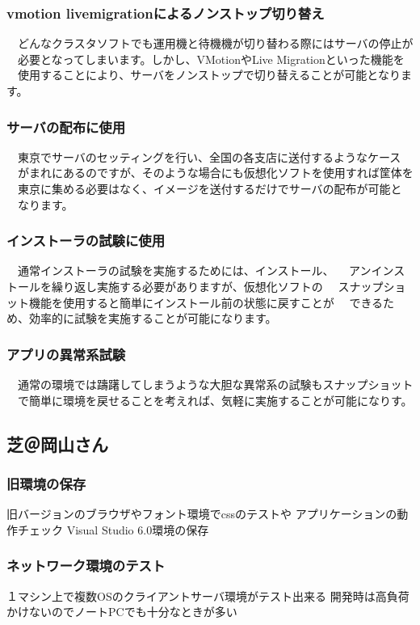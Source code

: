 \documentclass[mingoth,a4paper]{jsarticle}
\begin{document}
\subsubsection{vmotion livemigrationによるノンストップ切り替え}
　どんなクラスタソフトでも運用機と待機機が切り替わる際にはサーバの停止が
　必要となってしまいます。しかし、VMotionやLive Migrationといった機能を
　使用することにより、サーバをノンストップで切り替えることが可能となります。

\subsubsection{サーバの配布に使用}
　東京でサーバのセッティングを行い、全国の各支店に送付するようなケース
　がまれにあるのですが、そのような場合にも仮想化ソフトを使用すれば筐体を
　東京に集める必要はなく、イメージを送付するだけでサーバの配布が可能と
　なります。

\subsubsection{インストーラの試験に使用}
　通常インストーラの試験を実施するためには、インストール、
　アンインストールを繰り返し実施する必要がありますが、仮想化ソフトの
　スナップショット機能を使用すると簡単にインストール前の状態に戻すことが
　できるため、効率的に試験を実施することが可能になります。

\subsubsection{アプリの異常系試験}
　通常の環境では躊躇してしまうような大胆な異常系の試験もスナップショット
　で簡単に環境を戻せることを考えれば、気軽に実施することが可能になりす。

\subsection{芝＠岡山さん}

\subsubsection{旧環境の保存}
旧バージョンのブラウザやフォント環境でcssのテストや
アプリケーションの動作チェック
Visual Studio 6.0環境の保存

\subsubsection{ネットワーク環境のテスト}
１マシン上で複数OSのクライアントサーバ環境がテスト出来る
開発時は高負荷かけないのでノートPCでも十分なときが多い
\end{document}
